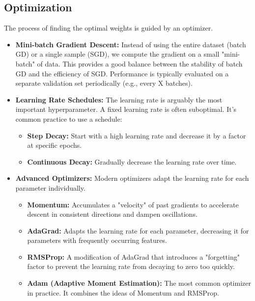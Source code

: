 \documentclass{article}
\begin{document}
\begin{multicols}{2}
\subsection{Optimization}
The process of finding the optimal weights is guided by an optimizer.
\begin{itemize}
    \item \textbf{Mini-batch Gradient Descent:} Instead of using the entire dataset (batch GD) or a single sample (SGD), we compute the gradient on a small "mini-batch" of data. This provides a good balance between the stability of batch GD and the efficiency of SGD. Performance is typically evaluated on a separate validation set periodically (e.g., every X batches).
    \item \textbf{Learning Rate Schedules:} The learning rate is arguably the most important hyperparameter. A fixed learning rate is often suboptimal. It's common practice to use a schedule:
    \begin{itemize}
        \item \textbf{Step Decay:} Start with a high learning rate and decrease it by a factor at specific epochs.
        \item \textbf{Continuous Decay:} Gradually decrease the learning rate over time.
    \end{itemize}
    \item \textbf{Advanced Optimizers:} Modern optimizers adapt the learning rate for each parameter individually.
    \begin{itemize}
        \item \textbf{Momentum:} Accumulates a "velocity" of past gradients to accelerate descent in consistent directions and dampen oscillations.
        \item \textbf{AdaGrad:} Adapts the learning rate for each parameter, decreasing it for parameters with frequently occurring features.
        \item \textbf{RMSProp:} A modification of AdaGrad that introduces a "forgetting" factor to prevent the learning rate from decaying to zero too quickly.
        \item \textbf{Adam (Adaptive Moment Estimation):} The most common optimizer in practice. It combines the ideas of Momentum and RMSProp.
    \end{itemize}
\end{itemize}


\end{multicols}
\end{document}
